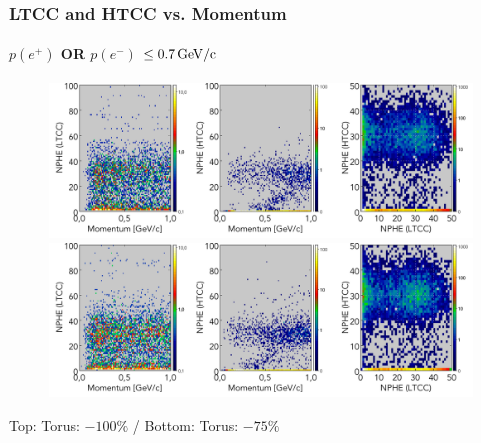\documentclass[xcolor=table, xcolor=dvipsnames]{beamer}
\begin{document}
\begin{frame}
	        \frametitle{LTCC and HTCC vs. Momentum}
	        \footnotesize
           \framesubtitle{$p(e^+)$ OR $p(e^-)$ $\le 0.7\,\rm{GeV/c}$}
           
           \begin{figure}
             \includegraphics[width=1\textwidth,height=0.25\textwidth]{triggerStudies_Tor1_cut07_LTCC_HTCC_P_OUT.png}\\
             \includegraphics[width=1\textwidth,height=0.25\textwidth]{triggerStudies_Tor075_cut07_LTCC_HTCC_P_OUT.png}
           \end{figure}
           
           Top: Torus: $-100\%$ / Bottom: Torus: $-75\%$
      
      \end{frame}
      
\end{document}
